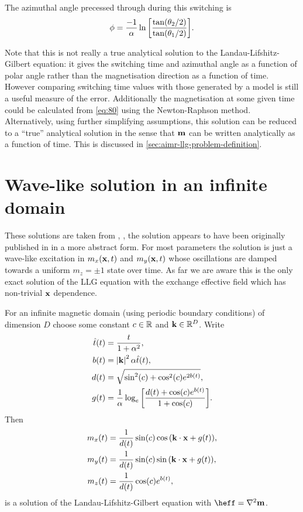 The azimuthal angle precessed through during this switching is
\begin{equation}
  \phi = \frac{-1}{\alpha} \ln {\left[  \frac{\tan(\theta_2/2)}{\tan(\theta_1/2)}  \right]}.
\end{equation}

Note that this is not really a true analytical solution to the Landau-Lifshitz-Gilbert equation:
it gives the switching time and azimuthal angle as a function of polar angle rather than the magnetisation direction as a function of time.
However comparing switching time values with those generated by a model is still a useful measure of the error.
Additionally the magnetisation at some given time could be calculated from \cref{eq:80} using \eg the Newton-Raphson method.
Alternatively, using further simplifying assumptions, this solution can be reduced to a ``true'' analytical solution in the sense that $\boldsymbol{\mathrm{m}}$ can be written analytically as a function of time.
This is discussed in \cref{sec:aimr-llg-problem-definition}.


\section{Wave-like solution in an infinite domain}
\label{sec:wave-like-solution}

These solutions are taken from \cite{Jeong2014}, \cite{Fuwa2006}, the solution appears to have been originally published in \cite{Lakshmanan1976} in a more abstract form.
For most parameters the solution is just a wave-like excitation in $m_x(\boldsymbol{\mathrm{x}}, t)$ and $m_y(\boldsymbol{\mathrm{x}}, t)$ whose oscillations are damped towards a uniform $m_z = \pm 1$ state over time.
As far we are aware this is the only exact solution of the LLG equation with the exchange effective field which has non-trivial $\boldsymbol{\mathrm{x}}$ dependence.

For an infinite magnetic domain (\ie using periodic boundary conditions) of dimension $D$ choose some constant $c \in \mathbb{R}$ and $\boldsymbol{\mathrm{k}} \in \mathbb{R}^D$.
Write
\begin{equation}
  \begin{aligned}
    \hat{t}(t) &= \frac{t}{1 + \alpha^2}, \\
    b(t) &= \left|{\boldsymbol{\mathrm{k}}} \right|^2 \alpha \hat{t}(t), \\
    d(t) &= \sqrt{\sin^2(c) + \cos^2(c)e^{2 b(t)}}, \\
    g(t) &= \frac{1}{\alpha} \log_e {\left[  \frac{d(t) + \cos(c) e^{b(t)}}{1 + \cos(c)}  \right]}.
  \end{aligned}
\end{equation}
Then
\begin{equation}
  \begin{aligned}
    m_x(t) &= \frac{1}{d(t)} \sin(c) \cos{\left( \boldsymbol{\mathrm{k}}\cdot \boldsymbol{\mathrm{x}}+ g(t)  \right)}, \\
    m_y(t) &= \frac{1}{d(t)} \sin(c) \sin{\left( \boldsymbol{\mathrm{k}}\cdot \boldsymbol{\mathrm{x}}+ g(t)  \right)}, \\
    m_z(t) &= \frac{1}{d(t)} \cos(c) e^{b(t)},
  \end{aligned}
\end{equation}
is a solution of the Landau-Lifshitz-Gilbert equation with $\heff = \lap \mv$.


